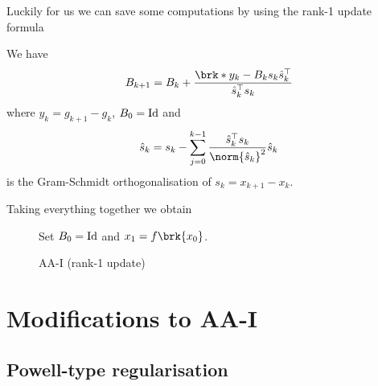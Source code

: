 \begin{frame}
	Luckily for us we can save some computations by using the rank-1 update formula
	\begin{proposition}
		We have
		\begin{align*}
			B_{k+1} = B_k+\frac{\brk*{y_k-B_ks_k}\hs_k^\top}{\hs_k^\top s_k}
		\end{align*}
		where $y_k = g_{k+1}-g_k$, $B_0=\operatorname{Id}$ and
		\begin{align*}
			\hs_k = s_k-\sum_{j=0}^{k-1}\frac{\hs_k^\top s_k}{\norm{\hs_k}^2}\hs_k
		\end{align*}
		is the Gram-Schmidt orthogonalisation of $s_k=x_{k+1}-x_k$.
	\end{proposition}
\end{frame}

\begin{frame}
	Taking everything together we obtain
	\begin{figure}
	\begin{algorithm}[H]
	\caption{AA-I (rank-1 update)}
	\color{gray}
	\BlankLine
	Set {\black$B_0=\operatorname{Id}$} and $x_1=f\brk{x_0}$.
	
	\end{algorithm}
	\end{figure}
\end{frame}


\section{Modifications to AA-I}
\subsection{Powell-type regularisation}

